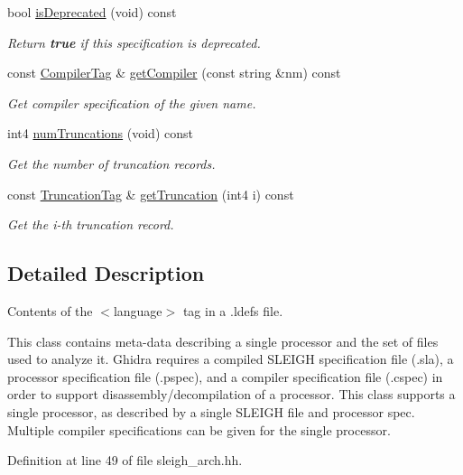 \begin{DoxyCompactItemize}
bool \mbox{\hyperlink{class_language_description_ae9ac918cc9aa1e1327c0996d83179142}{is\+Deprecated}} (void) const
\begin{DoxyCompactList}\small\item\em Return {\bfseries{true}} if this specification is deprecated. \end{DoxyCompactList}\item 
const \mbox{\hyperlink{class_compiler_tag}{Compiler\+Tag}} \& \mbox{\hyperlink{class_language_description_affb841959c4e35e73211e78048a5e156}{get\+Compiler}} (const string \&nm) const
\begin{DoxyCompactList}\small\item\em Get compiler specification of the given name. \end{DoxyCompactList}\item 
int4 \mbox{\hyperlink{class_language_description_ae8ebd52ceb6c7b018ba49aa6bc536a8b}{num\+Truncations}} (void) const
\begin{DoxyCompactList}\small\item\em Get the number of truncation records. \end{DoxyCompactList}\item 
const \mbox{\hyperlink{class_truncation_tag}{Truncation\+Tag}} \& \mbox{\hyperlink{class_language_description_abbf47b3b7347ba1bbe9a8fae01b2d4b9}{get\+Truncation}} (int4 i) const
\begin{DoxyCompactList}\small\item\em Get the i-\/th truncation record. \end{DoxyCompactList}\end{DoxyCompactItemize}


\subsection{Detailed Description}
Contents of the $<$language$>$ tag in a .ldefs file. 

This class contains meta-\/data describing a single processor and the set of files used to analyze it. Ghidra requires a compiled S\+L\+E\+I\+GH specification file (.sla), a processor specification file (.pspec), and a compiler specification file (.cspec) in order to support disassembly/decompilation of a processor. This class supports a single processor, as described by a single S\+L\+E\+I\+GH file and processor spec. Multiple compiler specifications can be given for the single processor. 

Definition at line 49 of file sleigh\+\_\+arch.\+hh.



